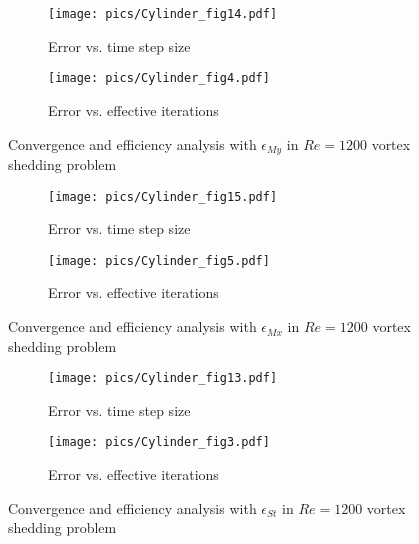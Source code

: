 \documentclass[preprint,12pt]{elsarticle}
\begin{document}
\begin{figure}[htbp]
    \centering
    \begin{subfigure}{0.5\textwidth}
        \texttt{[image: pics/Cylinder\_fig14.pdf]}
        \caption[]{Error vs. time step size}
        \label{sfig:CylinderRe1200_My_C}
    \end{subfigure}\hfill
    \begin{subfigure}{0.5\textwidth}
        \texttt{[image: pics/Cylinder\_fig4.pdf]}
        \caption[]{Error vs. effective iterations}
        \label{sfig:CylinderRe1200_My_E}
    \end{subfigure}
    \caption[]{Convergence and efficiency analysis with $\epsilon_{My}$ in $Re=1200$ vortex shedding problem}
    \label{fig:CylinderRe1200_My}
\end{figure}

\begin{figure}[htbp]
    \centering
    \begin{subfigure}{0.5\textwidth}
        \texttt{[image: pics/Cylinder\_fig15.pdf]}
        \caption[]{Error vs. time step size}
        \label{sfig:CylinderRe1200_Mx_C}
    \end{subfigure}\hfill
    \begin{subfigure}{0.5\textwidth}
        \texttt{[image: pics/Cylinder\_fig5.pdf]}
        \caption[]{Error vs. effective iterations}
        \label{sfig:CylinderRe1200_Mx_E}
    \end{subfigure}
    \caption[]{Convergence and efficiency analysis with $\epsilon_{Mx}$ in $Re=1200$ vortex shedding problem}
    \label{fig:CylinderRe1200_Mx}
\end{figure}

\begin{figure}[htbp]
    \centering
    \begin{subfigure}{0.5\textwidth}
        \texttt{[image: pics/Cylinder\_fig13.pdf]}
        \caption[]{Error vs. time step size}
        \label{sfig:CylinderRe1200_St_C}
    \end{subfigure}\hfill
    \begin{subfigure}{0.5\textwidth}
        \texttt{[image: pics/Cylinder\_fig3.pdf]}
        \caption[]{Error vs. effective iterations}
        \label{sfig:CylinderRe1200_St_E}
    \end{subfigure}
    \caption[]{Convergence and efficiency analysis with $\epsilon_{St}$ in $Re=1200$ vortex shedding problem}
    \label{fig:CylinderRe1200_St}
\end{figure}
\end{document}
